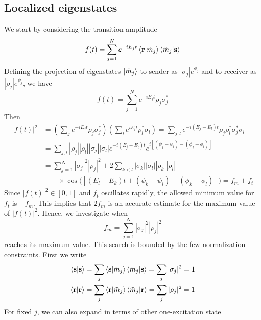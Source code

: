 \documentclass[../../../main.tex]{subfiles}
\begin{document}
\subsection{Localized eigenstates}
We start by considering the transition amplitude
\begin{equation*}
  f(t) = \sum_{j=1}^{N} e^{-i E_j t}\braket{\mathbf{r}|\tilde{m}_j }\braket{\tilde{m}_j |\mathbf{s} }
\end{equation*}
Defining the projection of eigenstates $\ket{\tilde{m}_j}$ to sender as $|\sigma_j| e ^{\phi_j}$ and to receiver as $|\rho_j| e ^{\psi_j}$, we have 
\begin{equation*}
  f(t) = \sum_{j=1}^{N} e^{-i E_j t}\rho_j \sigma_j ^*
\end{equation*}
Then
\begin{align*}
  |f(t)|^2
   & = \left(\sum_j e^{-iE_j t}\rho_j\sigma_j^*\right)\left(\sum_l e^{iE_l t}\rho_l^*\sigma_l\right)
  =  \sum_{j,l} e^{-i(E_j-E_l)t}\rho_j\rho_l^*\sigma_j^*\sigma_l                                             \\
   & = \sum_{j,l}|\rho_j||\rho_l||\sigma_j||\sigma_l|e^{-i(E_j-E_l)t} e^{i[(\psi_j-\psi_l)-(\phi_j-\phi_l)]} \\
   & = \sum_{j=1}^N |\sigma_j|^2 |\rho_j|^2 + 2\sum_{k<l} |\sigma_k||\sigma_l||\rho_k||\rho_l|               \\
   & \qquad\times\cos\big([(E_l-E_k)t + (\psi_k-\psi_l) - (\phi_k-\phi_l)]\big) = f_m + f_t
\end{align*}
Since $|f(t)|^2\in [0,1]$ and $f_t$ oscillates rapidly, the allowed minimum value for $f_t$ is $-f_m$.
This implies that $2f_m$ is an accurate estimate for the maximum value of $|f(t)|^2$.
Hence, we investigate when
\begin{equation*}
  f_m = \sum_{j=1}^N |\sigma_j|^2 |\rho_j|^2
\end{equation*}
reaches its maximum value.
This search is bounded by the few normalization constraints.
First we write
\begin{align*}
  \braket{\mathbf{s} | \mathbf{s}}
   & =  \sum_{j } \braket{\mathbf{s }  | \tilde{m}_j } \braket{\tilde{m}_j  | \mathbf{s}}
  = \sum_{j } |\sigma_j|^2 = 1                                                            \\
  \braket{\mathbf{r} | \mathbf{r}}
   & =  \sum_{j } \braket{\mathbf{r }  | \tilde{m}_j } \braket{\tilde{m}_j  | \mathbf{r}}
  = \sum_{j } |\rho_j|^2 = 1
\end{align*}
For fixed $j$, we can also expand in terms of other one-excitation state
\end{document}
